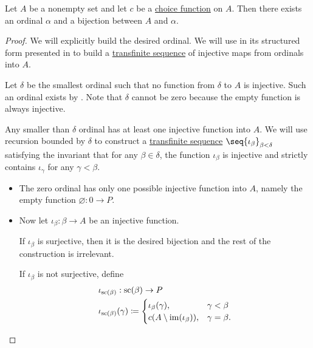 \begin{lemma}\label{thm:ordinal_bijection_and_choice}
  Let \( A \) be a nonempty set and let \( c \) be a \hyperref[def:choice_function]{choice function} on \( A \). Then there exists an ordinal \( \alpha \) and a bijection between \( A \) and \( \alpha \).
\end{lemma}
\begin{proof}
  We will explicitly build the desired ordinal. We will use  in its structured form presented in  to build a \hyperref[def:transfinite_sequence]{transfinite sequence} of injective maps from ordinals into \( A \).

  Let \( \delta \) be the smallest ordinal such that no function from \( \delta \) to \( A \) is injective. Such an ordinal exists by . Note that \( \delta \) cannot be zero because the empty function is always injective.

  Any smaller than \( \delta \) ordinal has at least one injective function into \( A \). We will use recursion bounded by \( \delta \) to construct a \hyperref[def:transfinite_sequence]{transfinite sequence} \( \seq{ \iota_\beta }_{\beta < \delta} \) satisfying the invariant that for any \( \beta \in \delta \), the function \( \iota_\beta \) is injective and strictly contains \( \iota_\gamma \) for any \( \gamma < \beta \).

  \begin{itemize}
    \item The zero ordinal has only one possible injective function into \( A \), namely the empty function \( \varnothing: 0 \to P \).

    \item Now let \( \iota_\beta: \beta \to A \) be an injective function.

    If \( \iota_\beta \) is surjective, then it is the desired bijection and the rest of the construction is irrelevant.

    If \( \iota_\beta \) is not surjective, define
    \begin{equation*}
      \begin{aligned}
        &\iota_{\op{sc}(\beta)}: \op{sc}(\beta) \to P \\
        &\iota_{\op{sc}(\beta)}(\gamma) \coloneqq \begin{cases}
          \iota_\beta(\gamma),         &\gamma < \beta \\
          c(A \setminus \img(\iota_\beta)), &\gamma = \beta.
        \end{cases}
      \end{aligned}
    \end{equation*}


\end{itemize}
\end{proof}
